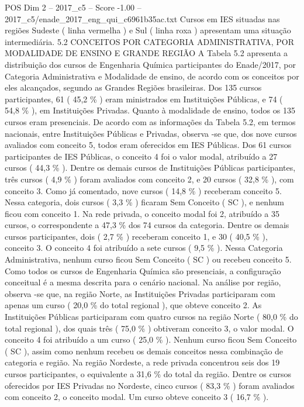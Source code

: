 \begin{textsample}{POS Dim 2 – 2017\_c5 – Score -1.00 – 2017\_c5/enade\_2017\_eng\_qui\_c6961b35ac.txt}
Cursos em IES situadas nas regiões Sudeste ( linha vermelha ) e Sul ( linha roxa ) apresentam uma situação intermediária. 5.2 CONCEITOS POR CATEGORIA ADMINISTRATIVA, POR MODALIDADE DE ENSINO E GRANDE REGIÃO A Tabela 5.2 apresenta a distribuição dos cursos de Engenharia Química participantes do Enade/2017, por Categoria Administrativa e Modalidade de ensino, de acordo com os conceitos por eles alcançados, segundo as Grandes Regiões brasileiras.
Dos 135 cursos participantes, 61 ( 45,2 \% ) eram ministrados em Instituições Públicas, e 74 ( 54,8 \% ), em Instituições Privadas.
Quanto à modalidade de ensino, todos os 135 cursos eram presenciais.
De acordo com as informações da Tabela 5.2, em termos nacionais, entre Instituições Públicas e Privadas, observa -se que, dos nove cursos avaliados com conceito 5, todos eram oferecidos em IES Públicas.
Dos 61 cursos participantes de IES Públicas, o conceito 4 foi o valor modal, atribuído a 27 cursos ( 44,3 \% ).
Dentre os demais cursos de Instituições Públicas participantes, três cursos ( 4,9 \% ) foram avaliados com conceito 2, e 20 cursos ( 32,8 \% ), com conceito 3.
Como já comentado, nove cursos ( 14,8 \% ) receberam conceito 5.
Nessa categoria, dois cursos ( 3,3 \% ) ficaram Sem Conceito ( SC ), e nenhum ficou com conceito 1.
Na rede privada, o conceito modal foi 2, atribuído a 35 cursos, o correspondente a 47,3 \% dos 74 cursos da categoria.
Dentre os demais cursos participantes, dois ( 2,7 \% ) receberam conceito 1, e 30 ( 40,5 \% ), conceito 3.
O conceito 4 foi atribuído a sete cursos ( 9,5 \% ).
Nessa Categoria Administrativa, nenhum curso ficou Sem Conceito ( SC ) ou recebeu conceito 5.
Como todos os cursos de Engenharia Química são presenciais, a configuração conceitual é a mesma descrita para o cenário nacional.
Na análise por região, observa -se que, na região Norte, as Instituições Privadas participaram com apenas um curso ( 20,0 \% do total regional ), que obteve conceito 2.
As Instituições Públicas participaram com quatro cursos na região Norte ( 80,0 \% do total regional ), dos quais três ( 75,0 \% ) obtiveram conceito 3, o valor modal.
O conceito 4 foi atribuído a um curso ( 25,0 \% ).
Nenhum curso ficou Sem Conceito ( SC ), assim como nenhum recebeu os demais conceitos nessa combinação de categoria e região.
Na região Nordeste, a rede privada concentrou seis dos 19 cursos participantes, o equivalente a 31,6 \% do total da região.
Dentre os cursos oferecidos por IES Privadas no Nordeste, cinco cursos ( 83,3 \% ) foram avaliados com conceito 2, o conceito modal.
Um curso obteve conceito 3 ( 16,7 \% ).

\end{textsample}
